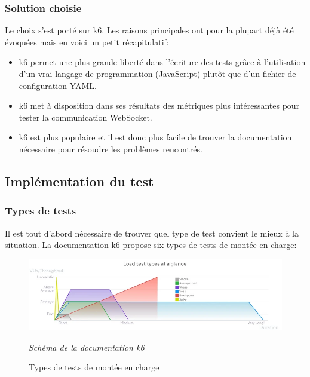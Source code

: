 \subsubsection{Solution choisie}

Le choix s'est porté sur k6. Les raisons principales ont pour la plupart déjà été évoquées mais en voici un petit récapitulatif:

\begin{itemize}
  \item k6 permet une plus grande liberté dans l'écriture des tests grâce à l'utilisation d'un vrai langage de programmation (JavaScript) plutôt que d'un fichier de configuration YAML.
  \item k6 met à disposition dans ses résultats des métriques plus intéressantes pour tester la communication WebSocket.
  \item k6 est plus populaire et il est donc plus facile de trouver la documentation nécessaire pour résoudre les problèmes rencontrés.
\end{itemize}

\subsection{Implémentation du test}

\subsubsection{Types de tests}

Il est tout d'abord nécessaire de trouver quel type de test convient le mieux à la situation. La documentation k6 propose six types de tests de montée en charge:

\begin{figure}[H]
  \centering
  \includegraphics[width=1\textwidth]{./assets/figures/load-test-types.png}
  \begin{center}
    \textit{Schéma de la documentation k6~\cite{k6-load-test-types}}
  \end{center}
  \caption{Types de tests de montée en charge}
  \label{fig:load-test-types}
\end{figure}

